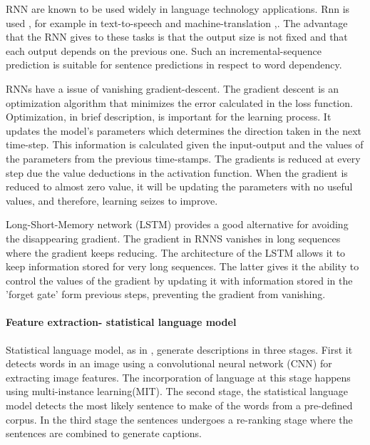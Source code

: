 RNN are known to be used widely in language technology applications. Rnn is used , for example in  text-to-speech \cite{arik2017deep} and  machine-translation \cite{cho2014learning},\cite{Wu2016GooglesNM}. The advantage that the RNN gives to these tasks is that the output size is not fixed and that each output depends on the previous one. Such an incremental-sequence prediction is suitable for sentence predictions in respect to word dependency.  

RNNs have a issue of vanishing gradient-descent. The gradient descent is an optimization algorithm that minimizes the error calculated in the loss function. Optimization, in brief description, is important for the learning process. It updates the model's parameters which determines the  direction taken in the next time-step. This information is calculated given the input-output and the values of the parameters from the previous time-stamps. The gradients is reduced at every step due the value deductions in the activation function. When the gradient is reduced to almost zero value, it will be updating the parameters with no useful values, and therefore, learning seizes to improve. 

Long-Short-Memory network (LSTM)  provides a good alternative for avoiding the disappearing gradient. The gradient in RNNS vanishes in long sequences where the gradient keeps reducing. The architecture of the LSTM allows it to keep information stored for very long sequences. The latter gives it the ability to control the values of the gradient by updating it with information stored in the 'forget gate' form previous steps, preventing the gradient from vanishing.  


\paragraph{Feature extraction- statistical language model}

Statistical language model, as in \cite{fang2015captions}, generate descriptions in three stages. First it detects words in an image using a convolutional neural network (CNN) for extracting image features. The incorporation of language at this stage happens using multi-instance learning(MIT)\cite{zhang2005multiple}. The second stage, the statistical language model detects the most likely sentence to make of the words from a pre-defined corpus. In the third stage the sentences undergoes a re-ranking stage where the sentences are combined to generate captions. 


